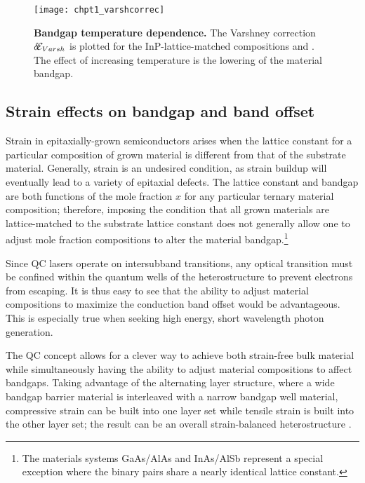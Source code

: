 \documentclass[12pt]{report}
\begin{document}
{\begin{figure}[tp]
\centering
\texttt{[image: chpt1\_varshcorrec]}
\caption[Bandgap temperature dependence]{{\textbf{Bandgap temperature dependence.}}  The Varshney correction $\delta\!\EE_{{Varsh}}$ is plotted for the InP-lattice-matched compositions \InGaAs and \AlInAs.  The effect of increasing temperature is the lowering of the material bandgap.}
\label{chpt1:varsh_correc}
\end{figure}

\subsection{Strain effects on bandgap and band offset}

Strain in epitaxially-grown semiconductors arises when the lattice constant for a particular composition of grown material is different from that of the substrate material.  Generally, strain is an undesired condition, as strain buildup will eventually lead to a variety of epitaxial defects.  The lattice constant and bandgap are both functions of the mole fraction $x$ for any particular ternary material composition; therefore, imposing the condition that all grown materials are lattice-matched to the substrate lattice constant does not generally allow one to adjust mole fraction compositions to alter the material bandgap.\footnote{The materials systems GaAs/AlAs and InAs/AlSb represent a special exception where the binary pairs share a nearly identical lattice constant.}

Since QC lasers operate on intersubband transitions, any optical transition must be confined within the quantum wells of the heterostructure to prevent electrons from escaping.  It is thus easy to see that the ability to adjust material compositions to maximize the conduction band offset would be advantageous. This is especially true when seeking high energy, short wavelength photon generation.

The QC concept allows for a clever way to achieve both strain-free bulk material while simultaneously having the ability to adjust material compositions to affect bandgaps.  Taking advantage of the alternating layer structure, where a wide bandgap barrier material is interleaved with a narrow bandgap well material, compressive strain can be built into one layer set while tensile strain is built into the other layer set; the result can be an overall strain-balanced heterostructure \cite{Faist:APL:1998:short}.

}
\end{document}
